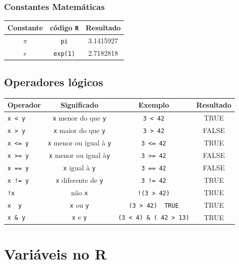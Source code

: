 \documentclass[
]{book}
\begin{document}
\hypertarget{constantes-matemuxe1ticas}{%
\subsubsection*{Constantes Matemáticas}\label{constantes-matemuxe1ticas}}

\begin{longtable}[]{@{}ccc@{}}
\toprule
Constante & código \texttt{R} & Resultado\tabularnewline
\midrule
\endhead
\(\pi\) & \texttt{pi} & 3.1415927\tabularnewline
\(e\) & \texttt{exp(1)} & 2.7182818\tabularnewline
\bottomrule
\end{longtable}

\hypertarget{operadores-luxf3gicos}{%
\subsection{Operadores lógicos}\label{operadores-luxf3gicos}}

\begin{longtable}[]{@{}lccc@{}}
\toprule
Operador & Significado & Exemplo & Resultado\tabularnewline
\midrule
\endhead
\texttt{x\ \textless{}\ y} & \texttt{x} menor do que \texttt{y} & \texttt{3\ \textless{}\ 42} & TRUE\tabularnewline
\texttt{x\ \textgreater{}\ y} & \texttt{x} maior do que \texttt{y} & \texttt{3\ \textgreater{}\ 42} & FALSE\tabularnewline
\texttt{x\ \textless{}=\ y} & \texttt{x} menor ou igual à \texttt{y} & \texttt{3\ \textless{}=\ 42} & TRUE\tabularnewline
\texttt{x\ \textgreater{}=\ y} & \texttt{x} menor ou igual à\texttt{y} & \texttt{3\ \textgreater{}=\ 42} & FALSE\tabularnewline
\texttt{x\ ==\ y} & \texttt{x} igual à \texttt{y} & \texttt{3\ ==\ 42} & FALSE\tabularnewline
\texttt{x\ !=\ y} & \texttt{x} diferente de \texttt{y} & \texttt{3\ !=\ 42} & TRUE\tabularnewline
\texttt{!x} & não \texttt{x} & \texttt{!(3\ \textgreater{}\ 42)} & TRUE\tabularnewline
\texttt{x\ \textbar{}\ y} & \texttt{x} ou \texttt{y} & \texttt{(3\ \textgreater{}\ 42)\ \textbar{}\ TRUE} & TRUE\tabularnewline
\texttt{x\ \&\ y} & \texttt{x} e \texttt{y} & \texttt{(3\ \textless{}\ 4)\ \&\ (\ 42\ \textgreater{}\ 13)} & TRUE\tabularnewline
\bottomrule
\end{longtable}

\hypertarget{variuxe1veis-no-r}{%
\section{Variáveis no R}\label{variuxe1veis-no-r}}
\end{document}
